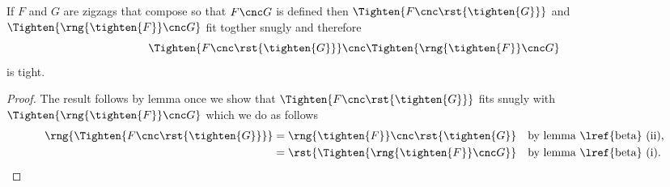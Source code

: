 \newcommand{\tighteningLeft}{\Tighten{ F \cnc 
                                  \rst{\tighten{G}}
                                      }
                            }

\newcommand {\tighteningRight}{\Tighten{ 
                                      \rng{\tighten{F}} 
                                  \cnc G
                                        }
                              }
\newcommand {\theTightening}{\tighteningLeft \cnc \tighteningRight}

\begin{lemma}
If $F$ and $G$ are zigzags that compose so that
$F \cnc G$ is defined then 
$\tighteningLeft$ and $\tighteningRight$
fit togther snugly and therefore 
\[
\theTightening
\]
is tight.
\end{lemma}
\begin{proof}
The result follows 
by lemma  
once we  show that
$\tighteningLeft$ fits snugly with $\tighteningRight$
which we do as follows
\begin{align*}
\rng{\tighteningLeft} 
  &= \rng{\tighten{F}} \cnc \rst{\tighten{G}}
  && \mbox{by lemma \lref{beta} (ii),}\\
  &= \rst{\tighteningRight}
  && \mbox{by lemma \lref{beta} (i).}
\end{align*}
\end{proof}


